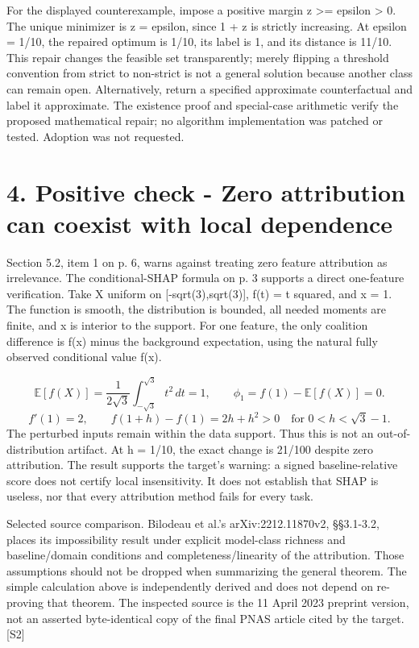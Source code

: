 \documentclass[10pt]{article}
\begin{document}
For the displayed counterexample, impose a positive margin z >= epsilon > 0. The unique minimizer is z = epsilon, since 1 + z is strictly increasing. At epsilon = 1/10, the repaired optimum is 1/10, its label is 1, and its distance is 11/10. This repair changes the feasible set transparently; merely flipping a threshold convention from strict to non-strict is not a general solution because another class can remain open. Alternatively, return a specified approximate counterfactual and label it approximate. The existence proof and special-case arithmetic verify the proposed mathematical repair; no algorithm implementation was patched or tested. Adoption was not requested.\par
\section*{4. Positive check - Zero attribution can coexist with local dependence}
Section 5.2, item 1 on p. 6, warns against treating zero feature attribution as irrelevance. The conditional-SHAP formula on p. 3 supports a direct one-feature verification. Take X uniform on [-sqrt(3),sqrt(3)], f(t) = t squared, and x = 1. The function is smooth, the distribution is bounded, all needed moments are finite, and x is interior to the support. For one feature, the only coalition difference is f(x) minus the background expectation, using the natural fully observed conditional value f(x).\par
\[\mathbb{E}[f(X)]=\frac{1}{2\sqrt{3}}\int_{-\sqrt{3}}^{\sqrt{3}}t^2\,dt=1,\qquad \phi_1=f(1)-\mathbb{E}[f(X)]=0.\] \[f'(1)=2,\qquad f(1+h)-f(1)=2h+h^2>0\quad\text{for }0<h<\sqrt{3}-1.\] The perturbed inputs remain within the data support. Thus this is not an out-of-distribution artifact. At h = 1/10, the exact change is 21/100 despite zero attribution. The result supports the target’s warning: a signed baseline-relative score does not certify local insensitivity. It does not establish that SHAP is useless, nor that every attribution method fails for every task.\par
Selected source comparison. Bilodeau et al.’s arXiv:2212.11870v2, §§3.1-3.2, places its impossibility result under explicit model-class richness and baseline/domain conditions and completeness/linearity of the attribution. Those assumptions should not be dropped when summarizing the general theorem. The simple calculation above is independently derived and does not depend on re-proving that theorem. The inspected source is the 11 April 2023 preprint version, not an asserted byte-identical copy of the final PNAS article cited by the target. [S2]\par
\end{document}
